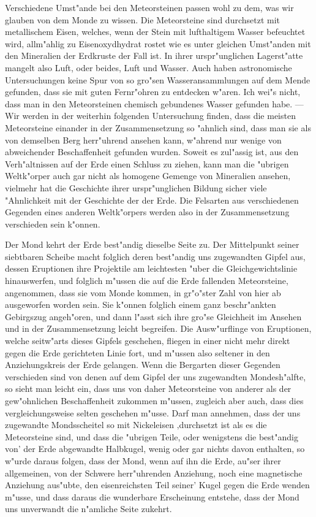 \documentclass[a4paper, 11pt, oneside]{article}
\begin{document}
Verschiedene Umst"ande bei den Meteorsteinen passen wohl zu dem, was wir glauben von dem Monde zu wissen. Die Meteorsteine sind durchsetzt mit metallischem Eisen, welches, wenn der Stein mit lufthaltigem Wasser befeuchtet wird, allm"ahlig zu Eisenoxydhydrat rostet wie es unter gleichen Umst"anden mit den Mineralien der Erdkruste der Fall ist. In ihrer urspr"unglichen Lagerst"atte mangelt also Luft, oder beides, Luft und Wasser. Auch haben astronomische Untersuchungen keine Spur von so gro"sen Wasseransammlungen auf dem Mende gefunden, dass sie mit guten Fernr"ohren zu entdecken w"aren. Ich wei"s nicht, dass man in den Meteorsteinen chemisch gebundenes Wasser gefunden habe. --- Wir werden in der weiterhin folgenden Untersuchung finden, dass die meisten Meteorsteine einander in der Zusammensetzung so "ahnlich sind, dass man sie als von demselben Berg herr"uhrend ansehen kann, w"ahrend nur wenige von abweichender Beschaffenheit gefunden wurden. Soweit es zul"assig ist, aus den Verh"altnissen auf der Erde einen Schluss zu ziehen, kann man die "ubrigen Weltk"orper auch gar nicht als homogene Gemenge von Mineralien ansehen, vielmehr hat die Geschichte ihrer urspr"unglichen Bildung sicher viele "Ahnlichkeit mit der Geschichte der der Erde. Die Felsarten aus verschiedenen Gegenden eines anderen Weltk"orpers werden also in der Zusammensetzung verschieden sein k"onnen.

Der Mond kehrt der Erde best"andig dieselbe Seite zu. Der Mittelpunkt seiner siebtbaren Scheibe macht folglich deren best"andig uns zugewandten Gipfel aus, dessen Eruptionen ihre Projektile am leichtesten "uber die Gleichgewichtslinie hinauswerfen, und folglich m"ussen die auf die Erde fallenden Meteorsteine, angenommen, dass sie vom Monde kommen, in gr"o"ster Zahl von hier ab ausgeworfen worden sein. Sie k"onnen folglich einem ganz beschr"ankten Gebirgszug angeh"oren, und dann l"asst sich ihre gro"se Gleichheit im Ansehen und in der Zusammensetzung leicht begreifen. Die Ausw"urflinge von Eruptionen, welche seitw"arts dieses Gipfels geschehen, fliegen in einer nicht mehr direkt gegen die Erde gerichteten Linie fort, und m"ussen also seltener in den Anziehungskreis der Erde gelangen. Wenn die Bergarten dieser Gegenden verschieden sind von denen auf dem Gipfel der uns zugewandten Mondesh"alfte, so sieht man leicht ein, dass uns von daher Meteorsteine von anderer als der gew"ohnlichen Beschaffenheit zukommen m"ussen, zugleich aber auch, dass dies vergleichungsweise selten geschehen m"usse. Darf man annehmen, dass der uns zugewandte Mondsscheitel so mit Nickeleisen ‚durchsetzt ist als es die Meteorsteine sind, und dass die "ubrigen Teile, oder wenigstens die best"andig von’ der Erde abgewandte Halbkugel, wenig oder gar nichts davon enthalten, so w"urde daraus folgen, dass der Mond, wenn auf ihn die Erde, au"ser ihrer allgemeinen, von der Schwere herr"uhrenden Anziehung, noch eine magnetische Anziehung aus"ubte, den eisenreichsten Teil seiner’ Kugel gegen die Erde wenden m"usse, und dass daraus die wunderbare Erscheinung entstehe, dass der Mond uns unverwandt die n"amliche Seite zukehrt.
\end{document}
